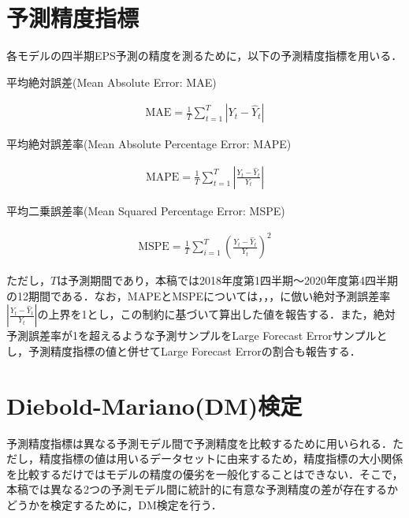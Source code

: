 \documentclass[a4paper，11pt]{jsarticle}
\begin{document}
\section{予測精度指標}

各モデルの四半期EPS予測の精度を測るために，以下の予測精度指標を用いる．

平均絶対誤差(Mean Absolute Error: MAE)

\begin{equation}
  \begin{split}
    \text{MAE} = \frac {1} {T} \sum^{T}_{t=1}\left| Y_t - \hat{Y}_t \right|
  \end{split}
\end{equation}

平均絶対誤差率(Mean Absolute Percentage Error: MAPE)

\begin{equation}
  \begin{split}
    \text{MAPE} = \frac {1} {T} \sum^{T}_{t=1}\left| \frac {Y_t - \hat{Y}_t} {Y_t} \right|
  \end{split}
\end{equation}

平均二乗誤差率(Mean Squared Percentage Error: MSPE)

\begin{equation}
  \begin{split}
    \text{MSPE} = \frac {1} {T} \sum^{T}_{i=1} \left( \frac {Y_t - \hat{Y}_t} {Y_t} \right) ^2
  \end{split}
\end{equation}

\noindent
ただし，$T$は予測期間であり，本稿では2018年度第1四半期～2020年度第4四半期の12期間である．なお，MAPEとMSPEについては，\cite*{brown1979univariate}，\cite*{lorek1996multivariate}，\cite{zhang2004neural}に倣い絶対予測誤差率$ \left| \frac{Y_t -{\hat Y}_t}{Y_t} \right|$の上界を1とし，この制約に基づいて算出した値を報告する．また，絶対予測誤差率が1を超えるような予測サンプルをLarge Forecast Errorサンプルとし，予測精度指標の値と併せてLarge Forecast Errorの割合も報告する．

\section{Diebold-Mariano(DM)検定}

予測精度指標は異なる予測モデル間で予測精度を比較するために用いられる．ただし，精度指標の値は用いるデータセットに由来するため，精度指標の大小関係を比較するだけではモデルの精度の優劣を一般化することはできない．そこで，本稿では異なる2つの予測モデル間に統計的に有意な予測精度の差が存在するかどうかを検定するために，DM検定\citep*{diebold2002comparing}を行う．
\end{document}
